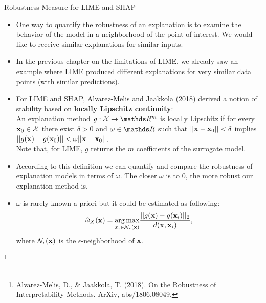 \documentclass[11pt,compress,t,notes=noshow, aspectratio=169, xcolor=table]{beamer}
\begin{document}
\begin{vbframe}{Robustness Measure for LIME and SHAP}  
	\begin{itemize}
		\item One way to quantify the robustness of an explanation is to examine the behavior of the model in a neighborhood of the point of interest. We would like to receive similar explanations for similar inputs. 
		\item In the previous chapter on the limitations of LIME, we already saw an example where LIME produced different explanations for very similar data points (with similar predictions).
		\item For LIME and SHAP, Alvarez-Melis and Jaakkola (2018) derived a notion of stability based on \textbf{locally Lipschitz continuity}: \\
		An explanation method $g:\Xspace \rightarrow \R^m$ is locally Lipschitz if for every $\xv_0 \in \Xspace$ there exist $\delta > 0$ and $\omega \in \R$ such that $||\xv - \xv_0|| < \delta$ implies $||g(\xv) - g(\xv_0)|| < \omega ||\xv - \xv_0||$. \\
		\footnotesize Note that, for LIME, $g$ returns the $m$ coefficients of the surrogate model. \normalsize
		\item According to this definition we can quantify and compare the robustness of explanation models in terms of $\omega$. 
		The closer $\omega$ is to 0, the more robust our explanation method is. 
		\item $\omega$ is rarely known a-priori but it could be estimated as following: 
		$$\hat{\omega}_{X}(\xv) = \underset{x_i \in \mathcal{N}_{\epsilon}(\xv)}{\arg \max} \frac{||g(\xv) - g(\xv_i)||_2}{d(\xv, \xv_i)},$$
		where $\mathcal{N}_{\epsilon}(\xv)$ is the $\epsilon$-neighborhood of $\xv$.
	\end{itemize}
\vspace{2cm}
\footnote[frame]{Alvarez-Melis, D., \& Jaakkola, T. (2018). On the Robustness of Interpretability Methods. ArXiv, abs/1806.08049.}
\end{vbframe}

\end{document}
